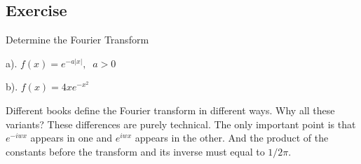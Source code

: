 \documentclass[aima331_lecturenotes_ku.tex]{subfiles}
\begin{document}
 \subsection{Exercise}
 Determine the Fourier Transform
   \begin{multicols}{2}
     a). $f(x)=e^{-a|x|}, \;\; a>0$
     \columnbreak

     b). $f(x) = 4xe^{-x^2}$
   \end{multicols}
   \begin{remark}
     Different books define the Fourier transform in different ways. Why all these variants? These differences are purely technical. The only important point is that $e^{-iwx}$ appears in one and $e^{iwx}$ appears in the other. And the product of the constants before the transform and its inverse must equal to $1/2\pi$.
   \end{remark}
\end{document}
